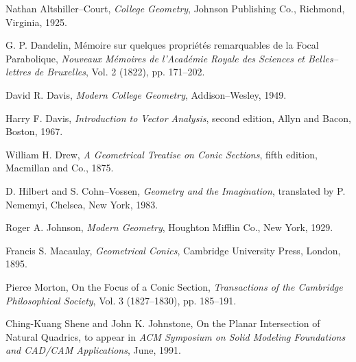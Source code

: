 \begin{thebibliography}{999}

     Nathan Altshiller--Court,
     {\em College Geometry},
     Johnson Publishing Co., Richmond, Virginia, 1925.

     G. P. Dandelin,
     M\'{e}moire sur quelques propri\'{e}t\'{e}s remarquables de la Focal
     Parabolique,
     {\em Nouveaux M\'{e}moires de l'Acad\'{e}mie Royale des Sciences et
     Belles--lettres de Bruxelles},
     Vol. 2 (1822), pp. 171--202.

     David R. Davis,
     {\em Modern College Geometry},
     Addison--Wesley, 1949.

     Harry F. Davis,
     {\em Introduction to Vector Analysis},
     second edition,
     Allyn and Bacon, Boston, 1967.

     William H. Drew,
     {\em A Geometrical Treatise on Conic Sections},
     fifth edition,
     Macmillan and Co., 1875.

     D. Hilbert and S. Cohn--Vossen,
     {\em Geometry and the Imagination},
     translated by P. Nememyi,
     Chelsea, New York, 1983.

     Roger A. Johnson,
     {\em Modern Geometry},
     Houghton Mifflin Co., New York, 1929.

     Francis S. Macaulay,
     {\em Geometrical Conics},
     Cambridge University Press, London, 1895.

     Pierce Morton,
     On the Focus of a Conic Section,
     {\em Transactions of the Cambridge Philosophical Society},
     Vol. 3 (1827--1830), pp. 185--191.

     Ching-Kuang Shene and John K. Johnstone,
     On the Planar Intersection of Natural Quadrics,
     to appear in {\em ACM Symposium on Solid Modeling Foundations and
     CAD/CAM Applications}, June, 1991.

\end{thebibliography}


